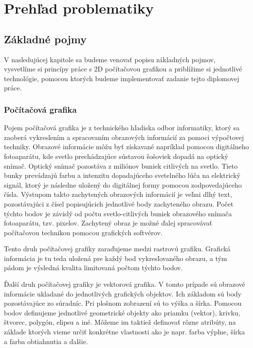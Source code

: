 \chapter{Prehľad problematiky}\label{chap:issues_overview}

\section{Základné pojmy}

V nasledujúcej kapitole sa budeme venovať popisu základných pojmov, vysvetlíme si princípy práce s 2D počítačovou grafikou a priblížime si jednotlivé technológie, pomocou ktorých budeme implementovať zadanie tejto diplomovej práce.

\subsection{Počítačová grafika}

Pojem počítačová grafika je z technického hľadiska odbor informatiky, ktorý sa zaoberá vykreslením a spracovaním obrazových informácií za pomoci výpočtovej techniky. Obrazové informácie môžu byť získavané napríklad pomocou digitálneho fotoaparátu, kde svetlo prechádzajúce sústavou šošoviek dopadá na optický snímač. Optický snímač pozostáva z miliónov buniek citlivých na svetlo. Tieto bunky prevádzajú farbu a intenzitu dopadajúceho svetelného lúča na elektrický signál, ktorý je následne uložený do digitálnej formy pomocou zodpovedajúceho čísla. Výstupom takto zachytených obrazových informácií je veľmi dlhý text, pozostávajúci z čísel popisujúcich jednotlivé body zachyteného obrazu. Počet týchto bodov je závislý od počtu svetlo-citlivých buniek obrazového snímača fotoaparátu, tzv. pixelov. Zachytený obraz je možné ďalej spracovávať počítačovou technikou pomocou grafických softvérov. 

Tento druh počítačovej grafiky zaraďujeme medzi rastrovú grafiku. Grafická informácia je tu teda uložená pre každý bod vykresľovaného obrazu, a tým pádom je výsledná kvalita limitovaná počtom týchto bodov. 

Ďalší druh počítačovej grafiky je vektorová grafika. V tomto prípade sú obrazové informácie ukladané do jednotlivých grafických objektov. Ich základom sú body pozostávajúce zo súradníc. Pri plošnom zobrazení sú to výška a šírka. Pomocou bodov definujeme jednotlivé geometrické objekty ako priamku (vektor), krivku, štvorec, polygón, elipsu a iné. Môžeme im taktiež definovať rôzne atribúty, na základe ktorých vieme určiť konkrétne vlastnosti ako je napr. farba výplne, šírka a farba obtiahnutia a ďalšie.

